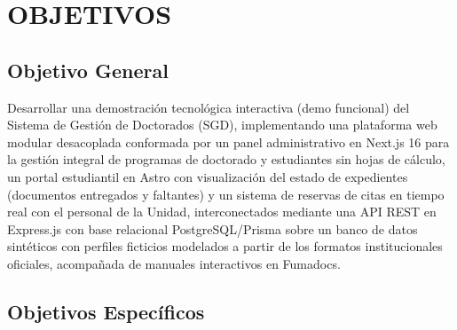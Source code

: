 
\section{OBJETIVOS}

\subsection{Objetivo General}

Desarrollar una demostración tecnológica interactiva (demo funcional) del Sistema de Gestión de Doctorados (SGD), implementando una plataforma web modular desacoplada conformada por un panel administrativo en Next.js 16 para la gestión integral de programas de doctorado y estudiantes sin hojas de cálculo, un portal estudiantil en Astro con visualización del estado de expedientes (documentos entregados y faltantes) y un sistema de reservas de citas en tiempo real con el personal de la Unidad, interconectados mediante una API REST en Express.js con base relacional PostgreSQL/Prisma sobre un banco de datos sintéticos con perfiles ficticios modelados a partir de los formatos institucionales oficiales, acompañada de manuales interactivos en Fumadocs.

\subsection{Objetivos Específicos}

